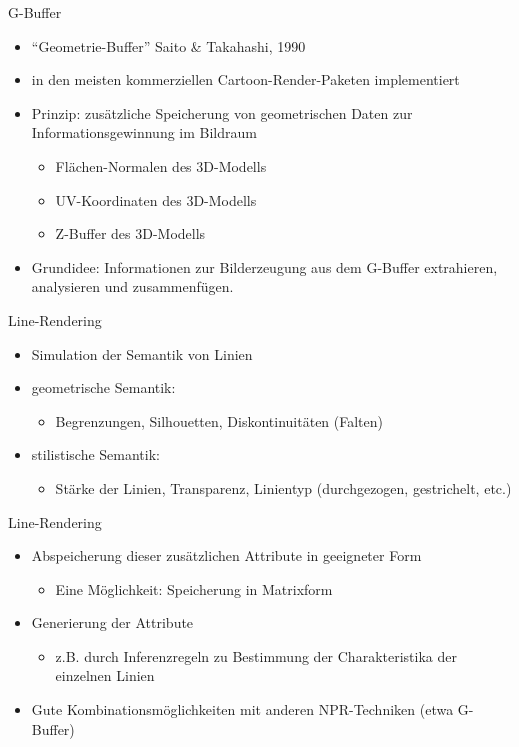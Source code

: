 \begin{frame}{G-Buffer}
  \begin{itemize}
    \item "`Geometrie-Buffer"' Saito \& Takahashi, 1990
    \item in den meisten kommerziellen Cartoon-Render-Paketen implementiert
    \item Prinzip: zusätzliche Speicherung von geometrischen
    Daten zur Informationsgewinnung im Bildraum
    \begin{itemize}
      \item Flächen-Normalen des 3D-Modells
      \item UV-Koordinaten des 3D-Modells
      \item Z-Buffer des 3D-Modells
    \end{itemize}
    \item Grundidee: Informationen zur Bilderzeugung aus dem G-Buffer
    extrahieren, analysieren und zusammenfügen.  
  \end{itemize}
\end{frame}

\begin{frame}{Line-Rendering}
  \begin{itemize}
    \item Simulation der Semantik von Linien
    \item geometrische Semantik:
    \begin{itemize}
      \item Begrenzungen, Silhouetten, Diskontinuitäten (Falten)
    \end{itemize}
    \item stilistische Semantik:
    \begin{itemize}
      \item Stärke der Linien, Transparenz, Linientyp (durchgezogen,
      gestrichelt, etc.)
    \end{itemize}
  \end{itemize}
\end{frame}

\begin{frame}{Line-Rendering}
  \begin{itemize}
    \item Abspeicherung dieser zusätzlichen Attribute in
    geeigneter Form
    \begin{itemize}
      \item Eine Möglichkeit: Speicherung in Matrixform
    \end{itemize}
    \item Generierung der Attribute
    \begin{itemize}
      \item z.B. durch Inferenzregeln zu Bestimmung der
      Charakteristika der einzelnen Linien
    \end{itemize}
    \item Gute Kombinationsmöglichkeiten mit anderen
    NPR-Techniken (etwa G-Buffer)
  \end{itemize}
\end{frame}

